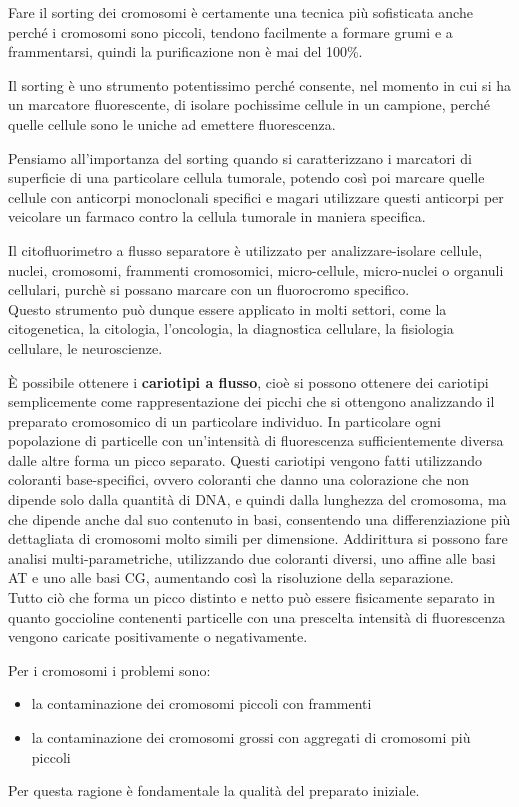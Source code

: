 \documentclass[11pt]{book}
\begin{document}
Fare il sorting dei cromosomi è certamente una tecnica più sofisticata anche perché i cromosomi sono piccoli, tendono facilmente a formare grumi e a frammentarsi, quindi la purificazione non è mai del 100\%.

Il sorting è uno strumento potentissimo perché consente, nel momento in cui si ha un marcatore fluorescente, di isolare pochissime cellule in un campione, perché quelle cellule sono le uniche ad emettere fluorescenza.

Pensiamo all’importanza del sorting quando si caratterizzano i marcatori di superficie di una particolare cellula tumorale, potendo così poi marcare quelle cellule con anticorpi monoclonali specifici e magari utilizzare questi anticorpi per veicolare un farmaco contro la cellula tumorale in maniera specifica.

Il citofluorimetro a flusso separatore è utilizzato per analizzare-isolare cellule, nuclei, cromosomi, frammenti cromosomici, micro-cellule, micro-nuclei o organuli cellulari, purchè si possano marcare con un fluorocromo specifico.\\
Questo strumento può dunque essere applicato in molti settori, come la citogenetica, la citologia, l'oncologia, la diagnostica cellulare, la fisiologia cellulare, le neuroscienze.

È possibile ottenere i \textbf{cariotipi a flusso}, cioè si possono ottenere dei cariotipi semplicemente come rappresentazione dei picchi che si ottengono analizzando il preparato cromosomico di un particolare individuo. In particolare ogni popolazione di particelle con un’intensità di fluorescenza sufficientemente diversa dalle altre forma un picco separato. Questi cariotipi vengono fatti utilizzando coloranti base-specifici, ovvero coloranti che danno una colorazione che non dipende solo dalla quantità di DNA, e quindi dalla lunghezza del cromosoma, ma che dipende anche dal suo contenuto in basi, consentendo una differenziazione più dettagliata di cromosomi molto simili per dimensione. Addirittura si possono fare analisi multi-parametriche, utilizzando due coloranti diversi, uno affine alle basi AT e uno alle basi CG, aumentando così la risoluzione della separazione.\\
Tutto ciò che forma un picco distinto e netto può essere fisicamente separato in quanto goccioline contenenti particelle con una prescelta intensità di fluorescenza vengono caricate positivamente o negativamente.

Per i cromosomi i problemi sono:
\begin{itemize}
\item la contaminazione dei cromosomi piccoli con frammenti 
\item la contaminazione dei cromosomi grossi con aggregati di cromosomi più piccoli
\end{itemize} 
Per questa ragione è fondamentale la qualità del preparato iniziale.
\end{document}
